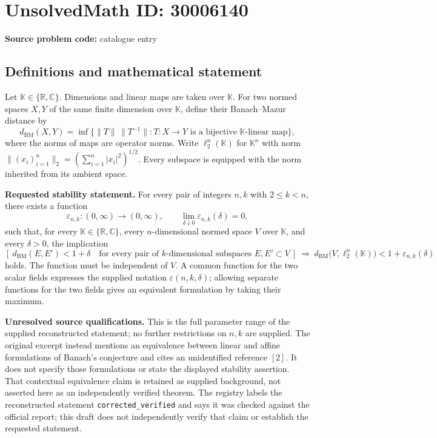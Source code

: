 \documentclass[11pt]{article}
\newcommand{\R}{\mathbb{R}}
\newcommand{\C}{\mathbb{C}}
\begin{document}
\section*{UnsolvedMath ID: 30006140}
\textbf{Source problem code:} catalogue entry
\subsection{Definitions and mathematical statement}
Let \(\mathbb K\in\{\R,\C\}\). Dimensions and linear maps are taken over \(\mathbb K\). For two normed spaces \(X,Y\) of the same finite dimension over \(\mathbb K\), define their Banach--Mazur distance by
\[
 d_{\mathrm{BM}}(X,Y)=\inf\bigl\{\|T\|\,\|T^{-1}\|:T:X\longrightarrow Y\text{ is a bijective }\mathbb K\text{-linear map}\bigr\},
\]
where the norms of maps are operator norms. Write \(\ell_2^n(\mathbb K)\) for \(\mathbb K^n\) with norm \(\|(x_i)_{i=1}^n\|_2=(\sum_{i=1}^n|x_i|^2)^{1/2}\). Every subspace is equipped with the norm inherited from its ambient space.

\textbf{Requested stability statement.} For every pair of integers \(n,k\) with \(2\leq k<n\), there exists a function
\[
 \varepsilon_{n,k}:(0,\infty)\longrightarrow(0,\infty),
 \qquad \lim_{\delta\downarrow0}\varepsilon_{n,k}(\delta)=0,
\]
such that, for every \(\mathbb K\in\{\R,\C\}\), every \(n\)-dimensional normed space \(V\) over \(\mathbb K\), and every \(\delta>0\), the implication
\[
 \left[\ d_{\mathrm{BM}}(E,E')<1+\delta
 \quad\text{for every pair of }k\text{-dimensional subspaces }E,E'\subset V\ \right]
 \ \Longrightarrow\ 
 d_{\mathrm{BM}}\bigl(V,\ell_2^n(\mathbb K)\bigr)<1+\varepsilon_{n,k}(\delta)
\]
holds. The function must be independent of \(V\). A common function for the two scalar fields expresses the supplied notation \(\varepsilon(n,k,\delta)\); allowing separate functions for the two fields gives an equivalent formulation by taking their maximum.

\textbf{Unresolved source qualifications.} This is the full parameter range of the supplied reconstructed statement; no further restrictions on \(n,k\) are supplied. The original excerpt instead mentions an equivalence between linear and affine formulations of Banach's conjecture and cites an unidentified reference \([2]\). It does not specify those formulations or state the displayed stability assertion. That contextual equivalence claim is retained as supplied background, not asserted here as an independently verified theorem. The registry labels the reconstructed statement \texttt{corrected\_verified} and says it was checked against the official report; this draft does not independently verify that claim or establish the requested statement.
\end{document}
